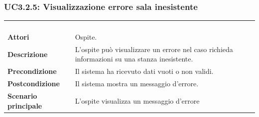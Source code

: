 \subsubsection{UC3.2.5: Visualizzazione errore sala inesistente}
\label{UC3.2.5}
\begin{longtable}{l|p{10cm}}
\rowcolor[gray]{0.8} \multicolumn{2}{c}{} \\
\rowcolor[gray]{0.8} \multicolumn{2}{c}{\textbf{UC3.2.5 - Visualizzazione errore sala inesistente}} \\
\rowcolor[gray]{0.8} \multicolumn{2}{c}{} \\
\hline
&\\
\textbf{Attori} & Ospite.\\[7pt]
\textbf{Descrizione} & L'ospite può visualizzare un errore nel caso richieda informazioni su una stanza inesistente.\\[7pt]
\textbf{Precondizione} & Il sistema ha ricevuto dati vuoti o non validi.\\[7pt]
\textbf{Postcondizione} & Il sistema mostra un messaggio d'errore.\\[7pt]
\textbf{Scenario principale} &L'ospite visualizza un messaggio d'errore\\[7pt]\hline
\end{longtable}

